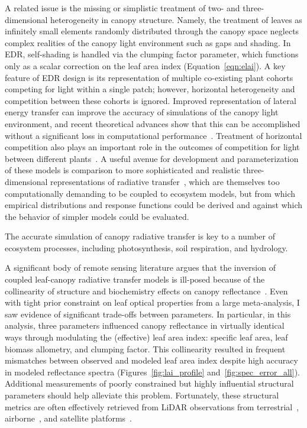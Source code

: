 A related issue is the missing or simplistic treatment of two- and three-dimensional heterogeneity in canopy structure.
Namely, the treatment of leaves as infinitely small elements randomly distributed through the canopy space neglects complex realities of the canopy light environment such as gaps and shading.
In EDR, self-shading is handled via the clumping factor parameter, which functions only as a scalar correction on the leaf area index (Equation~\ref{eqn:elai}).
A key feature of EDR design is its representation of multiple co-existing plant cohorts competing for light within a single patch;
however, horizontal heterogeneity and competition between these cohorts is ignored.
Improved representation of lateral energy transfer can improve the accuracy of simulations of the canopy light environment, and recent theoretical advances show that this can be accomplished without a significant loss in computational performance~\citep{hogan_2018_fast}.
Treatment of horizontal competition also plays an important role in the outcomes of competition for light between different plants~\citep{fisher2018vegetation}.
A useful avenue for development and parameterization of these models is comparison to more sophisticated and realistic three-dimensional representations of radiative transfer~\citep[e.g.][]{widlowski2007third}, which are themselves too computationally demanding to be coupled to ecosystem models, but from which empirical distributions and response functions could be derived and against which the behavior of simpler models could be evaluated.

The accurate simulation of canopy radiative transfer is key to a number of ecosystem processes, including photosynthesis, soil respiration, and hydrology.

A significant body of remote sensing literature argues that the inversion of coupled leaf-canopy radiative transfer models is ill-posed because of the collinearity of structure and biochemistry effects on canopy reflectance~\citep[e.g.][]{combal2003retrieval, lewis2007spectral}.
Even with tight prior constraint on leaf optical properties from a large meta-analysis, I saw evidence of significant trade-offs between parameters.
In particular, in this analysis, three parameters influenced canopy reflectance in virtually identical ways through modulating the (effective) leaf area index:
specific leaf area, leaf biomass allometry, and clumping factor.
This collinearity resulted in frequent mismatches between observed and modeled leaf area index despite high accuracy in modeled reflectance spectra (Figures~\ref{fig:lai_profile} and~\ref{fig:spec_error_all}).
Additional measurements of poorly constrained but highly influential structural parameters should help alleviate this problem.
Fortunately, these structural metrics are often effectively retrieved from LiDAR observations from terrestrial~\citep{eitel_2016_beyond}, airborne~\citep{antonarakis2014imaging}, and satellite platforms~\citep{coyle_2015_laser}.

